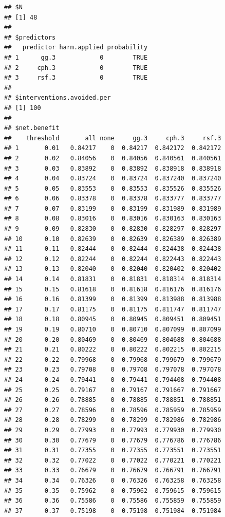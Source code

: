 \documentclass{article}\usepackage[]{graphicx}\usepackage[]{color}
\makeatletter
\newenvironment{kframe}{%
 \def\at@end@of@kframe{}%
 \ifinner\ifhmode%
  \def\at@end@of@kframe{\end{minipage}}%
  \begin{minipage}{\columnwidth}%
 \fi\fi%
 \def\FrameCommand##1{\hskip\@totalleftmargin \hskip-\fboxsep
 \colorbox{shadecolor}{##1}\hskip-\fboxsep
     \hskip-\linewidth \hskip-\@totalleftmargin \hskip\columnwidth}%
 \MakeFramed {\advance\hsize-\width
   \@totalleftmargin\z@ \linewidth\hsize
   \@setminipage}}%
 {\par\unskip\endMakeFramed%
 \at@end@of@kframe}
\newenvironment{knitrout}{}{} %
\makeatother
\begin{document}
\begin{knitrout}
\begin{kframe}\begin{verbatim}
## $N
## [1] 48
## 
## $predictors
##   predictor harm.applied probability
## 1      gg.3            0        TRUE
## 2     cph.3            0        TRUE
## 3     rsf.3            0        TRUE
## 
## $interventions.avoided.per
## [1] 100
## 
## $net.benefit
##    threshold       all none     gg.3     cph.3     rsf.3
## 1       0.01   0.84217    0  0.84217  0.842172  0.842172
## 2       0.02   0.84056    0  0.84056  0.840561  0.840561
## 3       0.03   0.83892    0  0.83892  0.838918  0.838918
## 4       0.04   0.83724    0  0.83724  0.837240  0.837240
## 5       0.05   0.83553    0  0.83553  0.835526  0.835526
## 6       0.06   0.83378    0  0.83378  0.833777  0.833777
## 7       0.07   0.83199    0  0.83199  0.831989  0.831989
## 8       0.08   0.83016    0  0.83016  0.830163  0.830163
## 9       0.09   0.82830    0  0.82830  0.828297  0.828297
## 10      0.10   0.82639    0  0.82639  0.826389  0.826389
## 11      0.11   0.82444    0  0.82444  0.824438  0.824438
## 12      0.12   0.82244    0  0.82244  0.822443  0.822443
## 13      0.13   0.82040    0  0.82040  0.820402  0.820402
## 14      0.14   0.81831    0  0.81831  0.818314  0.818314
## 15      0.15   0.81618    0  0.81618  0.816176  0.816176
## 16      0.16   0.81399    0  0.81399  0.813988  0.813988
## 17      0.17   0.81175    0  0.81175  0.811747  0.811747
## 18      0.18   0.80945    0  0.80945  0.809451  0.809451
## 19      0.19   0.80710    0  0.80710  0.807099  0.807099
## 20      0.20   0.80469    0  0.80469  0.804688  0.804688
## 21      0.21   0.80222    0  0.80222  0.802215  0.802215
## 22      0.22   0.79968    0  0.79968  0.799679  0.799679
## 23      0.23   0.79708    0  0.79708  0.797078  0.797078
## 24      0.24   0.79441    0  0.79441  0.794408  0.794408
## 25      0.25   0.79167    0  0.79167  0.791667  0.791667
## 26      0.26   0.78885    0  0.78885  0.788851  0.788851
## 27      0.27   0.78596    0  0.78596  0.785959  0.785959
## 28      0.28   0.78299    0  0.78299  0.782986  0.782986
## 29      0.29   0.77993    0  0.77993  0.779930  0.779930
## 30      0.30   0.77679    0  0.77679  0.776786  0.776786
## 31      0.31   0.77355    0  0.77355  0.773551  0.773551
## 32      0.32   0.77022    0  0.77022  0.770221  0.770221
## 33      0.33   0.76679    0  0.76679  0.766791  0.766791
## 34      0.34   0.76326    0  0.76326  0.763258  0.763258
## 35      0.35   0.75962    0  0.75962  0.759615  0.759615
## 36      0.36   0.75586    0  0.75586  0.755859  0.755859
## 37      0.37   0.75198    0  0.75198  0.751984  0.751984

\end{verbatim}
\end{kframe}
\end{knitrout}
\end{document}
